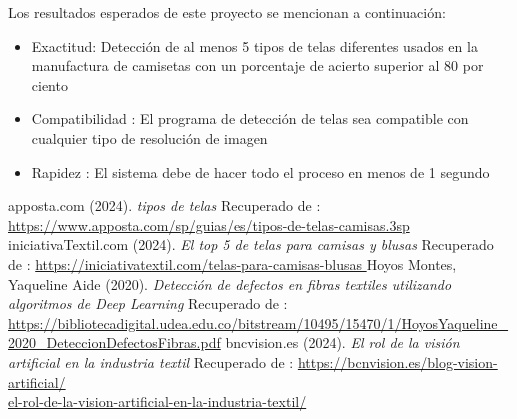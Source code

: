 \documentclass{article}
\begin{document}
Los resultados esperados de este proyecto se mencionan a continuación:

\begin{itemize}
    \item Exactitud: Detección de al menos 5 tipos de telas diferentes usados en la manufactura de camisetas con un porcentaje de acierto superior al 80 por ciento
    \item Compatibilidad : El programa de detección de telas sea compatible con cualquier tipo de resolución de imagen
    \item Rapidez : El sistema debe de hacer todo el proceso en menos de 1 segundo
\end{itemize}


\begin{thebibliography}{9}
    apposta.com (2024). \emph{tipos de telas} Recuperado de : \url{ https://www.apposta.com/sp/guias/es/tipos-de-telas-camisas.3sp }
    iniciativaTextil.com (2024). \emph{El top 5 de telas para camisas y blusas} Recuperado de : \url{ https://iniciativatextil.com/telas-para-camisas-blusas }
    Hoyos Montes, Yaqueline Aide (2020). \emph{ Detección de defectos en fibras textiles utilizando algoritmos de Deep Learning } Recuperado de : \url{https://bibliotecadigital.udea.edu.co/bitstream/10495/15470/1/HoyosYaqueline_2020_DeteccionDefectosFibras.pdf}
    bncvision.es (2024). \emph{ El rol de la visión artificial en la industria textil } Recuperado de :
    \url{https://bcnvision.es/blog-vision-artificial/} \\
    \url{el-rol-de-la-vision-artificial-en-la-industria-textil/}
\end{thebibliography}
\end{document}

